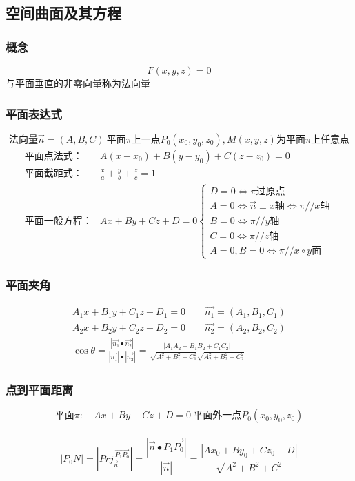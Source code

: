 \subsection{空间曲面及其方程}
\subsubsection{概念}
$$F(x,y,z)=0$$
\mbox{与平面垂直的非零向量称为法向量}\\
\subsubsection{平面表达式}
$$\mbox{法向量}\overrightarrow{n}=(A,B,C)\ \mbox{平面$\pi$上一点}P_0(x_0,y_0,z_0),M(x,y,z)\mbox{为平面$\pi$上任意点}$$
\begin{align*}
	\mbox{平面点法式：}&A(x-x_0)+B(y-y_0)+C(z-z_0)=0\\
	\mbox{平面截距式：}&\frac{x}{a}+\frac{y}{b}+\frac{z}{c}=1\\
	\mbox{平面一般方程：}&Ax+By+Cz+D=0\begin{cases}
		D=0\Leftrightarrow \pi\mbox{过原点}\\
		A=0\Leftrightarrow \overrightarrow{n}\perp x\mbox{轴}\Leftrightarrow \pi// x\mbox{轴}\\
		B=0\Leftrightarrow \pi// y\mbox{轴}\\
		C=0\Leftrightarrow \pi// z\mbox{轴}\\
		A=0,B=0\Leftrightarrow \pi// x\circ y\mbox{面}
	\end{cases}
\end{align*}
\subsubsection{平面夹角}
\begin{align*}
	A_1x+B_1y+C_1z+D_1=0\qquad \overrightarrow{n_1}=(A_1,B_1,C_1)\\
	A_2x+B_2y+C_2z+D_2=0\qquad \overrightarrow{n_2}=(A_2,B_2,C_2)\\
	\cos\theta=\frac{|\overrightarrow{n_1}\bullet\overrightarrow{n_2}|}{|\overrightarrow{n_1}|\bullet|\overrightarrow{n_2}|}=\frac{|A_1A_2+B_1B_2+C_1C_2|}{\sqrt{A_1^2+B_1^2+C_1^2}\sqrt{A_2^2+B_2^2+C_2^2}}
\end{align*}
\subsubsection{点到平面距离}
$$\mbox{平面}\pi:\quad Ax+By+Cz+D=0\ \mbox{平面外一点}P_0(x_0,y_0,z_0)$$\\
$$|P_0N|=\left|Prj_{\overrightarrow{n}}^{\ \overrightarrow{P_1P_0}}\right|=\frac{\left|\overrightarrow{n}\bullet\overrightarrow{P_1P_0}\right|}{|\overrightarrow{n}|}=\frac{|Ax_0+By_0+Cz_0+D|}{\sqrt{A^2+B^2+C^2}}$$
